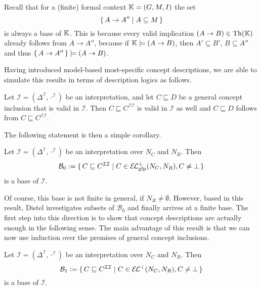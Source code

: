 Recall that for a (finite) formal context ${\mathbb{K}} = (G, M, I)$ the set
\begin{equation*}
  {\ensuremath{\{\, A \to A'' \mid A \subseteq M \,\}}}
\end{equation*}
is always a base of ${\mathbb{K}}$.  This is because every valid implication $(A \to B) \in
\operatorname{Th}({\mathbb{K}})$ already follows from $A \to A''$, because if ${\mathbb{K}} \models (A \to B)$, then
$A' \subseteq B'$, \ie $B \subseteq A''$ and thus ${\{\, A \to A ''\,\}} \models (A \to B)$.

Having introduced model-based most-specific concept descriptions, we are able to simulate
this results in terms of description logics as follows.
\begin{Lemma}
  \label{lem:simple-entailment-with-mmsc}
  Let $\mathcal{I} = (\Delta^{\mathcal{I}}, \cdot^{\mathcal{I}})$ be an interpretation,
  and let $C \sqsubseteq D$ be a general concept inclusion that is valid in $\mathcal{I}$.
  Then $C \sqsubseteq C^{\mathcal{I}\mathcal{I}}$ is valid in $\mathcal{I}$ as well and $C
  \sqsubseteq D$ follows from $C \sqsubseteq C^{\mathcal{I}\mathcal{I}}$.
\end{Lemma}

The following statement is then a simple corollary.

\begin{Corollary}
  \label{cor:Felix-base-B0}
  Let $\mathcal{I} = (\Delta^{\mathcal{I}}, \cdot^{\mathcal{I}})$ be an interpretation
  over $N_C$ and $N_R$.  Then
  \begin{equation}
    \label{eq:20}
    \mathcal{B}_0 := {\{\, C \sqsubseteq C^{\mathcal{I}\mathcal{I}} \mid C \in
      {\ensuremath{{\mathcal{E}\kern-.3ex\mathcal{L}}_\text{gfp}^\bot}}(N_C, N_R), C \neq \bot \,\}}
  \end{equation}
  is a base of $\mathcal{I}$.
\end{Corollary}

Of course, this base is not finite in general, \ie if $N_R \neq \emptyset$.  However,
based in this result, Distel investigates subsets of $\mathcal{B}_0$ and finally arrives
at a finite base.  The first step into this direction is to show that \ELbot concept
descriptions are actually enough in the following sense.  The main advantage of this
result is that we can now use induction over the premises of general concept inclusions.

\begin{Theorem}
  \label{thm:Felix-base-B1}
  Let $\mathcal{I} = (\Delta^{\mathcal{I}}, \cdot^{\mathcal{I}})$ be an interpretation
  over $N_C$ and $N_R$.  Then
  \begin{equation}
    \label{eq:21}
    \mathcal{B}_1 := {\{\, C \sqsubseteq C^{\mathcal{I}\mathcal{I}} \mid C \in {\ensuremath{{\mathcal{E}\kern-.3ex\mathcal{L}}^\bot}}(N_C,
      N_R), C \neq \bot \,\}}
  \end{equation}
  is a base of $\mathcal{I}$.
\end{Theorem}

